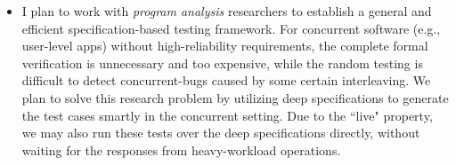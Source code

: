 \documentclass[a4paper, 10pt]{article}
\begin{document}
\begin{small}
\begin{itemize}
\begin{comment}
However, it is still a big challenge on how to formally model the time. We believe that the cure is still the event-based concurrent context.  
I am looking forward to exploring this huge research opportunity when combining the formal verification with CPS.
\end{comment}

\item I plan to work with
\emph{program analysis} researchers to establish a general and efficient specification-based testing framework.
For concurrent software (e.g., user-level apps) without high-reliability requirements, 
the complete formal verification is unnecessary and too expensive,
while the
random testing is difficult to detect concurrent-bugs caused by some certain interleaving.
We plan to solve this research problem by utilizing deep specifications to generate the test cases
smartly in the concurrent setting. Due to the ``live" property, we may also run these tests  over the deep specifications directly, without waiting for the responses from heavy-workload operations. 

\end{itemize}

\begin{comment}

But how to generate test cases smartly is always  for concurrent programs.
We believe that deep specifications can be 
There is a huge research opportunity 
lying in this zero-vulnerability system stack, but 

My Yale colleagues
and I have already started to use CertiKOS to verify more systems in this stack,
such as the file system and the network stacks.
Meanwhile, 
set up 
that enables the random test for user-level applications upon the topmost layer interface of mCertiKOS.
I believe there is a huge research opportunity that

and I am looking forward to exploring it.


 
 dramatically improve
the reliability and security of computing hosts in the critical areas.
This goal requires a wide and profound
cooperation with researchers in different areas.

utilize it  Based on the hardware that supports cryptography primitives, I want to
establish a reliable and secure stack that integrates the
This zero-vulnerability system stack will dramatically improve
the reliability and security of computing hosts in the critical areas. 
However, there are two significant challenges in building such a stack:
(1)  systems at different levels may have various
reliability requirements, some of which are still unclear how
to they can be specified and verified (e.g., the network stacks); and (2)
it is a big unknown how to link
all the certified systems together in a single framework
and provide the guarantee of the entire stack.


\end{comment}
\end{small}
\end{document}
